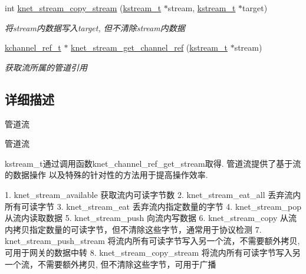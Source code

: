 \begin{DoxyCompactItemize}
int \hyperlink{a00137_gae6aa07ada933f68fb4ed6e19ffd310b4_gae6aa07ada933f68fb4ed6e19ffd310b4}{knet\+\_\+stream\+\_\+copy\+\_\+stream} (\hyperlink{a00066_acc208c4c40c875eebbfef88f00fffacf_acc208c4c40c875eebbfef88f00fffacf}{kstream\+\_\+t} $\ast$stream, \hyperlink{a00066_acc208c4c40c875eebbfef88f00fffacf_acc208c4c40c875eebbfef88f00fffacf}{kstream\+\_\+t} $\ast$target)
\begin{DoxyCompactList}\small\item\em 将stream内数据写入target, 但不清除stream内数据 \end{DoxyCompactList}\item 
\hyperlink{a00066_a3b7e82599367eade261456f60ebe2cd9_a3b7e82599367eade261456f60ebe2cd9}{kchannel\+\_\+ref\+\_\+t} $\ast$ \hyperlink{a00137_ga6ec1754b28f693f5a5c047aef8cda3a8_ga6ec1754b28f693f5a5c047aef8cda3a8}{knet\+\_\+stream\+\_\+get\+\_\+channel\+\_\+ref} (\hyperlink{a00066_acc208c4c40c875eebbfef88f00fffacf_acc208c4c40c875eebbfef88f00fffacf}{kstream\+\_\+t} $\ast$stream)
\begin{DoxyCompactList}\small\item\em 获取流所属的管道引用 \end{DoxyCompactList}\end{DoxyCompactItemize}


\subsection{详细描述}
管道流 


\begin{DoxyPre}
管道流\end{DoxyPre}



\begin{DoxyPre}kstream\_t通过调用函数knet\_channel\_ref\_get\_stream取得. 管道流提供了基于流的数据操作
以及特殊的针对性的方法用于提高操作效率.\end{DoxyPre}



\begin{DoxyPre}1. knet\_stream\_available   获取流内可读字节数
2. knet\_stream\_eat\_all     丢弃流内所有可读字节
3. knet\_stream\_eat         丢弃流内指定数量的字节
4. knet\_stream\_pop         从流内读取数据
5. knet\_stream\_push        向流内写数据
6. knet\_stream\_copy        从流内拷贝指定数量的可读字节，但不清除这些字节，通常用于协议检测
7. knet\_stream\_push\_stream 将流内所有可读字节写入另一个流，不需要额外拷贝, 可用于网关的数据中转
8. knet\_stream\_copy\_stream 将流内所有可读字节写入另一个流，不需要额外拷贝, 但不清除这些字节，可用于广播\end{DoxyPre}



